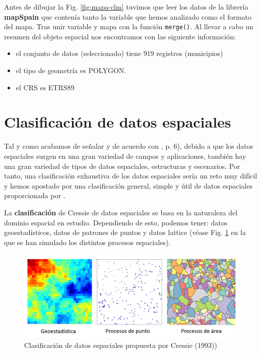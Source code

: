 \documentclass[
]{report}
\providecommand{\tightlist}{%
  \setlength{\itemsep}{0pt}\setlength{\parskip}{0pt}}
\theoremstyle{definition}
\theoremstyle{definition}
\theoremstyle{definition}
\theoremstyle{definition}
\theoremstyle{remark}
\begin{document}
Antes de dibujar la Fig. \ref{fig:mapa-clm} tuvimos que leer los datos de la
librería \textbf{mapSpain} \citep{rmapspain} que contenía tanto la variable que hemos
analizado como el formato del mapa. Tras unir variable y mapa con la función
\texttt{merge()}. Al llevar a cabo un resumen del objeto espacial nos encontramos con
las siguiente información:

\begin{itemize}
\tightlist
\item
  el conjunto de datos (seleccionado) tiene 919 registros (municipios)
\item
  el tipo de geometría es POLYGON.
\item
  el CRS es ETRS89
\end{itemize}

\hypertarget{clasificaciuxf3n-de-datos-espaciales}{%
\section{Clasificación de datos espaciales}\label{clasificaciuxf3n-de-datos-espaciales}}

Tal y como acabamos de señalar y de acuerdo con \citet{Schabenberger_Gotway_2005}, p.
6), debido a que los datos espaciales surgen en una gran variedad de campos y
aplicaciones, también hay una gran variedad de tipos de datos espaciales,
estructuras y escenarios. Por tanto, una clasificación exhaustiva de los datos
espaciales sería un reto muy difícil y hemos apostado por una clasificación
general, simple y útil de datos espaciales proporcionada por \citet{cressie1993}.

La \textbf{clasificación} de Cressie de datos espaciales se basa en la naturaleza del
dominio espacial en estudio. Dependiendo de esto, podemos tener: datos
geoestadísticos, datos de patrones de puntos y datos lattice (véase Fig.
\ref{fig:hengl-cressie} en la que se han simulado los distintos procesos
espaciales).

\begin{figure}

{\centering \includegraphics[width=0.6\linewidth]{img/cressie_simulados} 

}

\caption{Clasificación de datos espaciales propuesta por Cressie (1993))}\label{fig:hengl-cressie}
\end{figure}
\end{document}
